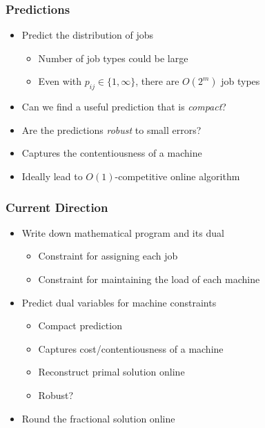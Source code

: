 \documentclass{beamer}
\begin{document}
\begin{frame}
\frametitle{Predictions}

\begin{itemize}
\item Predict the distribution of jobs
\begin{itemize}
\item Number of job types could be large
\item Even with $p_{ij} \in \{1,\infty\}$, there are $O(2^m)$ job types
\end{itemize}
\pause
\item Can we find a useful prediction that is \emph{compact}?
\item Are the predictions \emph{robust} to small errors?
\item Captures the contentiousness of a machine
\item Ideally lead to $O(1)$-competitive online algorithm
\end{itemize}
\end{frame}


\begin{frame}
\frametitle{Current Direction}

\begin{itemize}
\item Write down mathematical program and its dual
\begin{itemize}
\item Constraint for assigning each job
\item Constraint for maintaining the load of each machine
\end{itemize}
\pause
\item Predict dual variables for machine constraints
\begin{itemize}
\item Compact prediction
\item Captures cost/contentiousness of a machine
\item Reconstruct primal solution online
\item Robust?
\end{itemize}
\pause
\item Round the fractional solution online
\end{itemize}

\end{frame}
\end{document}

